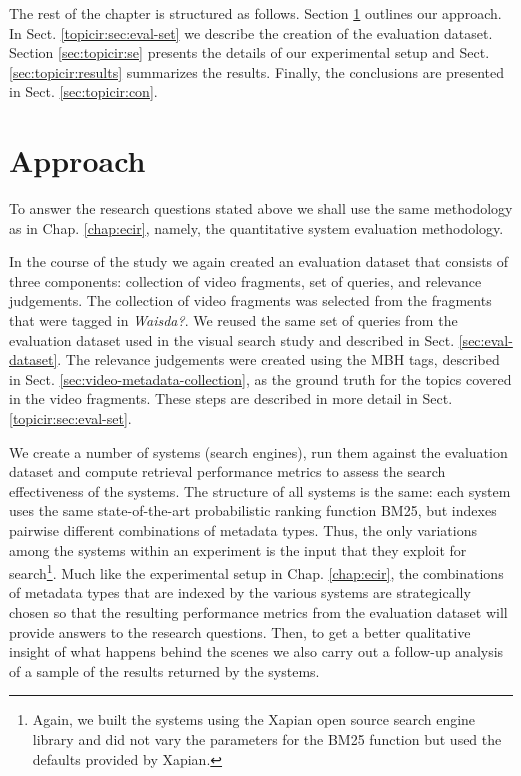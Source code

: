 The rest of the chapter is structured as follows. Section \ref{sec:approach} outlines our approach. In Sect. \ref{topicir:sec:eval-set} we describe the creation of the evaluation dataset. Section \ref{sec:topicir:se} presents the details of our experimental setup and Sect. \ref{sec:topicir:results} summarizes the results. Finally, the conclusions are presented in Sect. \ref{sec:topicir:con}.

\section{Approach}\label{sec:approach}
To answer the research questions stated above we shall use the same methodology as in Chap. \ref{chap:ecir}, namely, the quantitative system evaluation methodology.


In the course of the study we again created an evaluation dataset that consists of three components: collection of video fragments, set of queries, and relevance judgements. The collection of video fragments was selected from the fragments that were tagged in \textit{Waisda?}. We reused the same set of queries from the evaluation dataset used in the visual search study and described in Sect. \ref{sec:eval-dataset}. The relevance judgements were created using the MBH tags, described in Sect. \ref{sec:video-metadata-collection}, as the ground truth for the topics covered in the video fragments. These steps are described in more detail in Sect. \ref{topicir:sec:eval-set}.


We create a number of systems (search engines), run them against the evaluation dataset and compute retrieval performance metrics to assess the search effectiveness of the systems. The structure of all systems is the same: each system uses the same state-of-the-art probabilistic ranking function BM25, but indexes pairwise different combinations of metadata types. Thus, the only variations among the systems within an experiment is the input that they exploit for search\footnote{Again, we built the systems using the Xapian open source search engine library and did not vary the parameters for the BM25 function but used the defaults provided by Xapian.}. Much like the experimental setup in Chap. \ref{chap:ecir}, the combinations of metadata types that are indexed by the various systems are strategically chosen so that the resulting performance metrics from the evaluation dataset will provide answers to the research questions. Then, to get a better qualitative insight of what happens behind the scenes we also carry out a follow-up analysis of a sample of the results returned by the systems.

